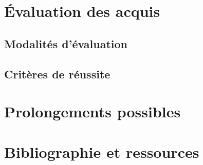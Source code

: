 \documentclass[11pt,a4paper]{article}
\begin{document}
\section{Évaluation des acquis}

\subsection{Modalités d'évaluation}

\subsection{Critères de réussite}

\section{Prolongements possibles}


\section{Bibliographie et ressources}

\end{document}
